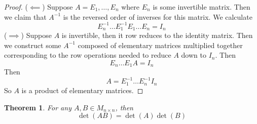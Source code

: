 \documentclass{article}
\newtheorem{theorem}{Theorem}[section]
\newtheorem{one minute paper}[theorem]{One Minute Paper}
\begin{document}
\begin{proof}
    ($\impliedby$) Suppose $A = E_1, \dots, E_n$ where $E_n$ is some invertible matrix. Then we claim that $A^{-1}$ is the reversed order of inverses for this matrix. We calculate 
    \begin{equation}
        E_n^{-1}\dots E_1^{-1}E_1 \dots E_n = I_n
    \end{equation} 
    ($\implies$) Suppose $A$ is invertible, then it row reduces to the identity matrix. Then we construct some $A^{-1}$ composed of elementary matrices multiplied together corresponding to the row operations needed to reduce $A$ down to $I_n$. Then
    \begin{equation}
        E_n\dots E_1 A = I_n
    \end{equation}
    Then 
    \begin{equation}
        A = E_1^{-1}\dots E_n^{-1}I_n
    \end{equation}
    So $A$ is a product of elementary matrices. 
\end{proof}

\begin{theorem}
    For any $A, B \in M_{n \times n}$, then 
    \begin{equation}
        \det(AB) = \det(A)\det(B)
    \end{equation}
\end{theorem}
\end{document}
